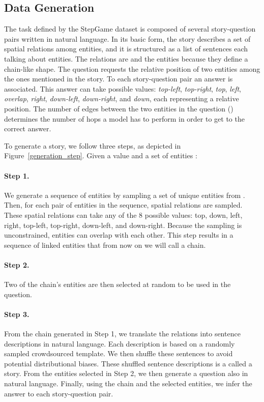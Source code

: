 \documentclass[letterpaper]{article} \usepackage{aaai22}  \usepackage{times}  \usepackage{helvet}  \usepackage{courier}  \usepackage[hyphens]{url}  \usepackage{graphicx} \urlstyle{rm} \def\UrlFont{\rm}  \usepackage{natbib}  \usepackage{caption} \DeclareCaptionStyle{ruled}{labelfont=normalfont,labelsep=colon,strut=off} \frenchspacing  \setlength{\pdfpagewidth}{8.5in}  \setlength{\pdfpageheight}{11in}  \usepackage{algorithm}
\begin{document}
\subsection{Data Generation}
\label{data_generation}


The task defined by the StepGame dataset is composed of several story-question pairs written in natural language. In its basic form, the story describes a set of  spatial relations among  entities, and it is structured as a list of  sentences each talking about  entities. The relations are  and the entities  because they define a chain-like shape. The question requests the relative position of two entities among the  ones mentioned in the story. To each story-question pair an answer is associated. This answer can take  possible values: \textit{top-left}, \textit{top-right}, \textit{top}, \textit{left}, \textit{overlap}, \textit{right}, \textit{down-left}, \textit{down-right}, and \textit{down}, each representing a relative position.
The number of edges between the two entities in the question () determines the number of hops a model has to perform in order to get to the correct answer.


To generate a story, we follow three steps, as depicted in Figure~\ref{generation_step}. Given a value  and a set of entities :

\paragraph{Step 1.} We generate a sequence of entities by sampling a set of  unique entities from . 
Then, for each pair of entities in the sequence,  spatial relations are sampled. These spatial relations can take any of the 8 possible values: top, down, left, right, top-left, top-right, down-left, and down-right. 
Because the sampling is unconstrained, entities can overlap with each other.
This step results in a sequence of linked entities that from now on we will call a chain. 

\paragraph{Step 2.} Two of the chain's entities are then selected at random to be used in the question.

\paragraph{Step 3.} From the chain generated in Step 1, 
we translate the  relations into  sentence descriptions in natural language. Each description is based on a randomly sampled crowdsourced template. We then shuffle these  sentences to avoid potential distributional biases. These shuffled  sentence descriptions is a called a story. From the entities selected in Step 2, we then generate a question also in natural language. Finally, using the chain and the selected entities, we infer the answer to each story-question pair.
\end{document}
